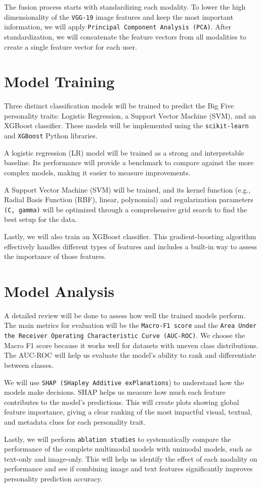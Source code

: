 The fusion process starts with standardizing each modality. To lower the high dimensionality of the \texttt{VGG-19} image features and keep the most important information, we will apply \texttt{Principal Component Analysis (PCA)}. After standardization, we will concatenate the feature vectors from all modalities to create a single feature vector for each user. 

\section{Model Training}
\label{subsec:models}

Three distinct classification models will be trained to predict the Big Five personality traits: Logistic Regression, a Support Vector Machine (SVM), and an XGBoost classifier. These models will be implemented using the \texttt{scikit-learn} \citep{pedregosa2011} and \texttt{XGBoost} \citep{chen2016}  Python libraries.

A logistic regression (LR) model will be trained as a strong and interpretable baseline. Its performance will provide a benchmark to compare against the more complex models, making it easier to measure improvements.  

A Support Vector Machine (SVM) will be trained, and its kernel function (e.g., Radial Basis Function (RBF), linear, polynomial) and regularization parameters \texttt{(C, gamma)} will be optimized through a comprehensive grid search to find the best setup for the data.

Lastly, we will also train an XGBoost classifier. This gradient-boosting algorithm effectively handles different types of features and includes a built-in way to assess the importance of those features.

\section{Model Analysis}
\label{subsec:analysis}
A detailed review will be done to assess how well the trained models perform. The main metrics for evaluation will be the \texttt{Macro-F1 score} and the \texttt{Area Under the Receiver Operating Characteristic Curve (AUC-ROC)}. We choose the Macro F1 score because it works well for datasets with uneven class distributions. The AUC-ROC will help us evaluate the model's ability to rank and differentiate between classes. 

We will use \texttt{SHAP (SHapley Additive exPlanations}) to understand how the models make decisions. SHAP helps us measure how much each feature contributes to the model's predictions. This will create plots showing global feature importance, giving a clear ranking of the most impactful visual, textual, and metadata clues for each personality trait. 

Lastly, we will perform \texttt{ablation studies} to systematically compare the performance of the complete multimodal models with unimodal models, such as text-only and image-only. This will help us identify the effect of each modality on performance and see if combining image and text features significantly improves personality prediction accuracy.
